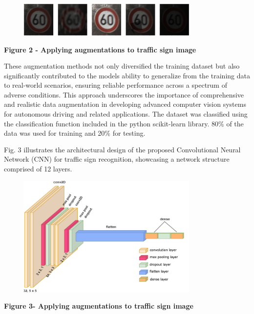 \begin{figure}[H]
	\centering
	\includegraphics[width=0.8\textwidth]{assets/58}
	\caption*{}
\end{figure}

\textbf{Figure 2 - Applying augmentations to traffic sign image}

These augmentation methods not only diversified the training dataset but
also significantly contributed to the model\textquotesingle s ability to
generalize from the training data to real-world scenarios, ensuring
reliable performance across a spectrum of adverse conditions. This
approach underscores the importance of comprehensive and realistic data
augmentation in developing advanced computer vision systems for
autonomous driving and related applications. The dataset was classified
using the classification function included in the python scikit-learn
library. 80\% of the data was used for training and 20\% for testing.

Fig. 3 illustrates the architectural design of the proposed
Convolutional Neural Network (CNN) for traffic sign recognition,
showcasing a network structure comprised of 12 layers.

\begin{figure}[H]
	\centering
	\includegraphics[width=0.8\textwidth]{assets/59}
	\caption*{}
\end{figure}

\textbf{Figure 3- Applying augmentations to traffic sign image}

